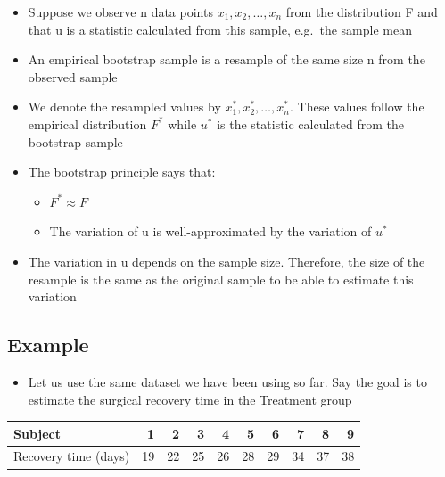 \documentclass[
]{book}
\providecommand{\tightlist}{%
  \setlength{\itemsep}{0pt}\setlength{\parskip}{0pt}}
\begin{document}
\begin{itemize}
\tightlist
\item
  Suppose we observe n data points \(x_1, x_2, …, x_n\) from the distribution F and that u is a statistic calculated from this sample, e.g.~the sample mean
\item
  An empirical bootstrap sample is a resample of the same size n from the observed sample
\item
  We denote the resampled values by \(x_1^*, x_2^*, …, x_n^*\). These values follow the empirical distribution \(F^*\) while \(u^*\) is the statistic calculated from the bootstrap sample
\item
  The bootstrap principle says that:

  \begin{itemize}
  \tightlist
  \item
    \(F^* ≈ F\)
  \item
    The variation of u is well-approximated by the variation of \(u^*\)
  \end{itemize}
\item
  The variation in u depends on the sample size. Therefore, the size of the resample is the same as the original sample to be able to estimate this variation
\end{itemize}

\hypertarget{example-10}{%
\subsection{Example}\label{example-10}}

\begin{itemize}
\tightlist
\item
  Let us use the same dataset we have been using so far. Say the goal is to estimate the surgical recovery time in the Treatment group
\end{itemize}

\begin{tabular}{l|r|r|r|r|r|r|r|r|r}
\hline
Subject &  1 &  2 &  3 &  4 &  5 &  6 &  7 &  8 &  9\\
\hline
Recovery time (days) & 19 & 22 & 25 & 26 & 28 & 29 & 34 & 37 & 38\\
\hline
\end{tabular}
\end{document}
